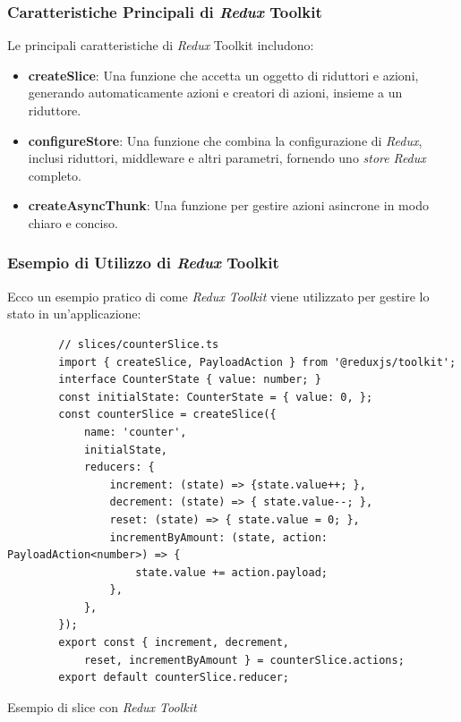 \subsubsection{Caratteristiche Principali di \textit{Redux} Toolkit}

Le principali caratteristiche di \textit{Redux} Toolkit includono:

\begin{itemize}
    \item \textbf{createSlice}: Una funzione che accetta un oggetto di riduttori e azioni,
     generando automaticamente azioni e creatori di azioni, insieme a un riduttore.
    \item \textbf{configureStore}: Una funzione che combina la configurazione di \textit{Redux}, inclusi riduttori, middleware e altri parametri, fornendo uno \textit{store} \textit{Redux} completo.
    \item \textbf{createAsyncThunk}: Una funzione per gestire azioni asincrone in modo chiaro e conciso.
\end{itemize}

\subsubsection{Esempio di Utilizzo di \textit{Redux} Toolkit}

Ecco un esempio pratico di come \textit{Redux Toolkit} viene utilizzato per gestire lo stato in un'applicazione:

\begin{listing}[H]
    \begin{verbatim}
        // slices/counterSlice.ts
        import { createSlice, PayloadAction } from '@reduxjs/toolkit';
        interface CounterState { value: number; }
        const initialState: CounterState = { value: 0, };
        const counterSlice = createSlice({
            name: 'counter',
            initialState,
            reducers: {
                increment: (state) => {state.value++; },
                decrement: (state) => { state.value--; },
                reset: (state) => { state.value = 0; },
                incrementByAmount: (state, action: PayloadAction<number>) => {
                    state.value += action.payload;
                },
            },
        });
        export const { increment, decrement, 
            reset, incrementByAmount } = counterSlice.actions;
        export default counterSlice.reducer;
    \end{verbatim}
    \caption{Esempio di slice con \textit{Redux Toolkit}}
    \label{listing:redux_toolkit_slice}
\end{listing}

